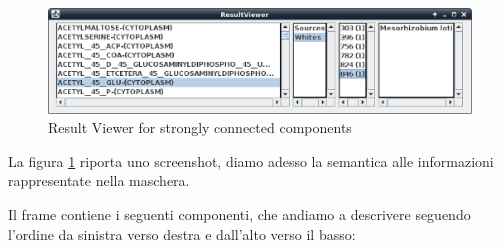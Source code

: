 \begin{figure}
  \centering
  \includegraphics[scale=.5,
  angle=90]{images/ResultViewer-execution.eps}
  \caption{Result Viewer for strongly connected components}
  \label{fig:result-viewer-scc}
\end{figure}
La figura \ref{fig:result-viewer-scc} riporta uno screenshot, diamo
adesso la semantica alle informazioni rappresentate nella maschera.

Il frame contiene i seguenti componenti, che andiamo a descrivere
seguendo l'ordine da sinistra verso destra e dall'alto verso il basso:
